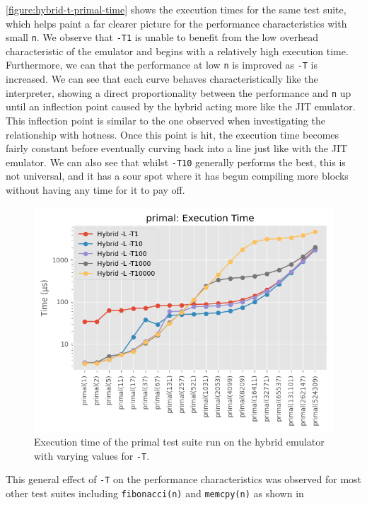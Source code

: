 \autoref{figure:hybrid-t-primal-time} shows the execution times for the same test suite, which helps paint a far clearer picture for the performance characteristics with small \texttt{n}. We observe that \texttt{-T1} is unable to benefit from the low overhead characteristic of the emulator and begins with a relatively high execution time. Furthermore, we can that the performance at low \texttt{n} is improved as \texttt{-T} is increased. We can see that each curve behaves characteristically like the interpreter, showing a direct proportionality between the performance and \texttt{n} up until an inflection point caused by the hybrid acting more like the JIT emulator. This inflection point is similar to the one observed when investigating the relationship with hotness. Once this point is hit, the execution time becomes fairly constant before eventually curving back into a line just like with the JIT emulator. We can also see that whilst \texttt{-T10} generally performs the best, this is not universal, and it has a sour spot where it has begun compiling more blocks without having any time for it to pay off.

\begin{figure}[H]
    \centering
    \includegraphics[scale=0.75]{output/graphs/tests/hybrid_t/primal/time.png}
    \caption{Execution time of the primal test suite run on the hybrid emulator with varying values for \texttt{-T}.}
    \label{figure:hybrid-t-primal-time}
\end{figure}

This general effect of \texttt{-T} on the performance characteristics was observed for most other test suites including \texttt{fibonacci(n)} and \texttt{memcpy(n)} as shown in 

